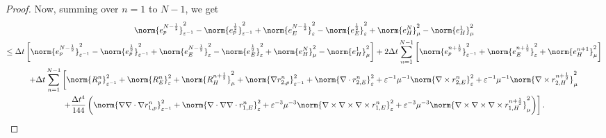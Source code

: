 \documentclass{amsart}
\theoremstyle{thmstyleone}%
\theoremstyle{thmstyletwo}%
\theoremstyle{thmstylethree}%
\begin{document}
\begin{proof}
Now, summing over $n = 1$ to $N-1$, we get
\begin{multline*}
  \norm{e_p^{N - \frac{1}{2}}}^2_{\varepsilon^{-1}} - \norm{e_p^{ \frac{1}{2}}}^2_{\varepsilon^{-1}} + \norm{e_E^{N - \frac{1}{2}}}^2_{\varepsilon} - \norm{e_E^{\frac{1}{2}}}^2_{\varepsilon} + \norm{e_H^N}^2_{\mu} -  \norm{e_H^1}^2_{\mu} \\ \le \Delta t \left[ \norm{e_p^{N - \frac{1}{2}}}^2_{\varepsilon^{-1}} - \norm{e_p^{ \frac{1}{2}}}^2_{\varepsilon^{-1}} + \norm{e_E^{N - \frac{1}{2}}}^2_{\varepsilon} - \norm{e_E^{\frac{1}{2}}}^2_{\varepsilon} + \norm{e_H^N}^2_{\mu} -  \norm{e_H^1}^2_{\mu}\right] + 2 \Delta t \sum\limits_{n = 1}^{N - 1} \left[ \norm{e_p^{n + \frac{1}{2}}}^2_{\varepsilon^{-1}} + \norm{e_E^{n + \frac{1}{2}}}^2_{\varepsilon} + \norm{e_H^{n+1}}^2_{\mu}\right] \\ +
 \Delta t \sum\limits_{n = 1}^{N - 1} \left[ \norm{R_p^n}^2_{\varepsilon^{-1}} + \norm{R_E^n}^2_{\varepsilon} + \norm{R_H^{n + \frac{1}{2}}}^2_{\mu} + \norm{\nabla r_{2,p}^n} ^2_{\varepsilon^{-1}} + \norm{\nabla \cdot r_{2,E}^n}^2_{\varepsilon} + \varepsilon^{-1} \mu^{-1} \norm{\nabla \times r_{2,E}^n}^2_{\varepsilon} +  \varepsilon^{-1} \mu^{-1} \norm{\nabla \times r_{2,H}^{n + \frac{1}{2}}}^2_{\mu} \right. \\ 
\left. + \dfrac{\Delta t^4}{144} \left( \norm{\nabla \nabla \cdot \nabla r_{1,p}^n} ^2_{\varepsilon^{-1}} + \norm{\nabla \cdot \nabla \nabla \cdot r_{1,E}^n}^2_{\varepsilon} + \varepsilon^{-3} \mu^{-3} \norm{\nabla \times \nabla \times \nabla \times r_{1,E}^n}^2_{\varepsilon} +  \varepsilon^{-3} \mu^{-3} \norm{\nabla \times \nabla \times \nabla \times r_{1,H}^{n + \frac{1}{2}}}^2_{\mu} \right) \right].
\end{multline*}


\end{proof}
\end{document}
